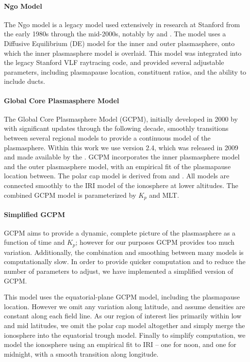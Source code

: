 \paragraph{Ngo Model}

The Ngo model is a legacy model used extensively in research at Stanford from the early 1980s through the mid-2000s, notably by \cite{Lauben1998} and \cite{Bortnik2005}. The model uses a Diffusive Equilibrium (DE) model for the inner and outer plasmasphere, onto which the \cite{Carpenter1992} inner plasmasphere model is overlaid. This model was integrated into the legacy Stanford VLF raytracing code, and provided several adjustable parameters, including plasmapause location, constituent ratios, and the ability to include ducts.

\paragraph{Global Core Plasmasphere Model}

The Global Core Plasmasphere Model (GCPM), initially developed in 2000 by \cite{Gallagher1999} with significant updates through the following decade, smoothly transitions between several regional models to provide a continuous model of the plasmasphere. Within this work we use version 2.4, which was released in 2009 and made available by the . GCPM incorporates the \cite{Carpenter1992} inner plasmasphere model and the \cite{Gallagher1995} outer plasmasphere model, with an empirical fit of the plasmapause location between. The polar cap model is derived from \cite{Persoon1983} and \cite{Chandler1991}. All models are connected smoothly to the IRI model of the ionosphere at lower altitudes. The combined GCPM model is parameterized by $K_p$ and MLT.

\paragraph{Simplified GCPM}

GCPM aims to provide a dynamic, complete picture of the plasmasphere as a function of time and $K_p$; however for our purposes GCPM provides too much variation. Additionally, the combination and smoothing between many models is computationally slow. In order to provide quicker computation and to reduce the number of parameters to adjust, we have implemented a simplified version of GCPM.

This model uses the equatorial-plane GCPM model, including the plasmapause location. However we omit any variation along latitude, and assume densities are constant along each field line. As our region of interest lies primarily within low and mid latitudes, we omit the polar cap model altogether and simply merge the ionosphere into the equatorial trough model. Finally to simplify computation, we model the ionosphere using an empirical fit to IRI -- one for noon, and one for midnight, with a smooth transition along longitude.


